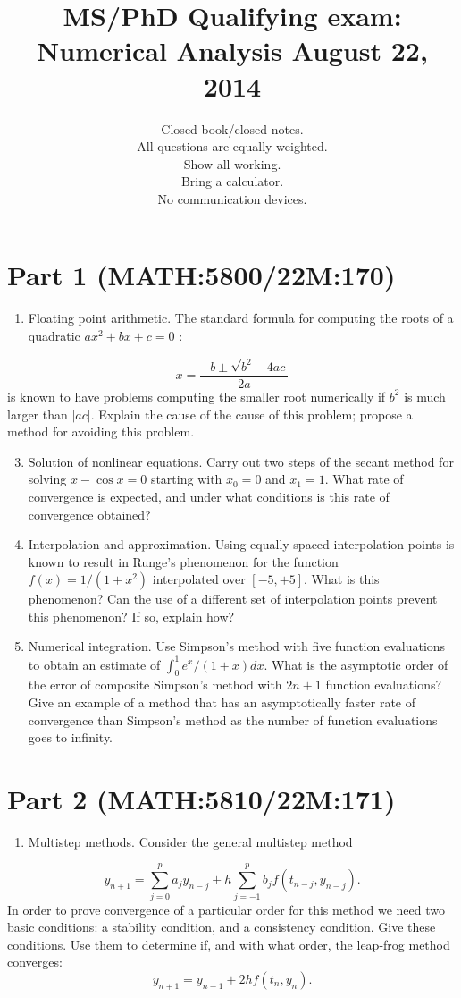 \documentclass[10pt]{article}
\title{MS/PhD Qualifying exam: Numerical Analysis August 22, 2014 }
\author{Closed book/closed notes.\\
All questions are equally weighted.\\
Show all working.\\
Bring a calculator.\\
No communication devices.}
\date{}
\begin{document}
\maketitle


\section*{Part 1 (MATH:5800/22M:170) }
\begin{enumerate}
  \item Floating point arithmetic. The standard formula for computing the roots of a quadratic $a x^{2}+b x+c=0$ :
\end{enumerate}
$$
x=\frac{-b \pm \sqrt{b^{2}-4 a c}}{2 a}
$$
is known to have problems computing the smaller root numerically if $b^{2}$ is much larger than $|a c|$. Explain the cause of the cause of this problem; propose a method for avoiding this problem.

\begin{enumerate}
  \setcounter{enumi}{2}
  \item Solution of nonlinear equations. Carry out two steps of the secant method for solving $x-\cos x=0$ starting with $x_{0}=0$ and $x_{1}=1$. What rate of convergence is expected, and under what conditions is this rate of convergence obtained?

  \item Interpolation and approximation. Using equally spaced interpolation points is known to result in Runge's phenomenon for the function $f(x)=1 /\left(1+x^{2}\right)$ interpolated over $[-5,+5]$. What is this phenomenon? Can the use of a different set of interpolation points prevent this phenomenon? If so, explain how?

  \item Numerical integration. Use Simpson's method with five function evaluations to obtain an estimate of $\int_{0}^{1} e^{x} /(1+x) d x$. What is the asymptotic order of the error of composite Simpson's method with $2 n+1$ function evaluations? Give an example of a method that has an asymptotically faster rate of convergence than Simpson's method as the number of function evaluations goes to infinity.

\end{enumerate}
\section{Part 2 (MATH:5810/22M:171)}
\begin{enumerate}
  \item Multistep methods. Consider the general multistep method
\end{enumerate}
$$
y_{n+1}=\sum_{j=0}^{p} a_{j} y_{n-j}+h \sum_{j=-1}^{p} b_{j} f\left(t_{n-j}, y_{n-j}\right) .
$$
In order to prove convergence of a particular order for this method we need two basic conditions: a stability condition, and a consistency condition. Give these conditions. Use them to determine if, and with what order, the leap-frog method converges:
$$
y_{n+1}=y_{n-1}+2 h f\left(t_{n}, y_{n}\right) .
$$
\end{document}

